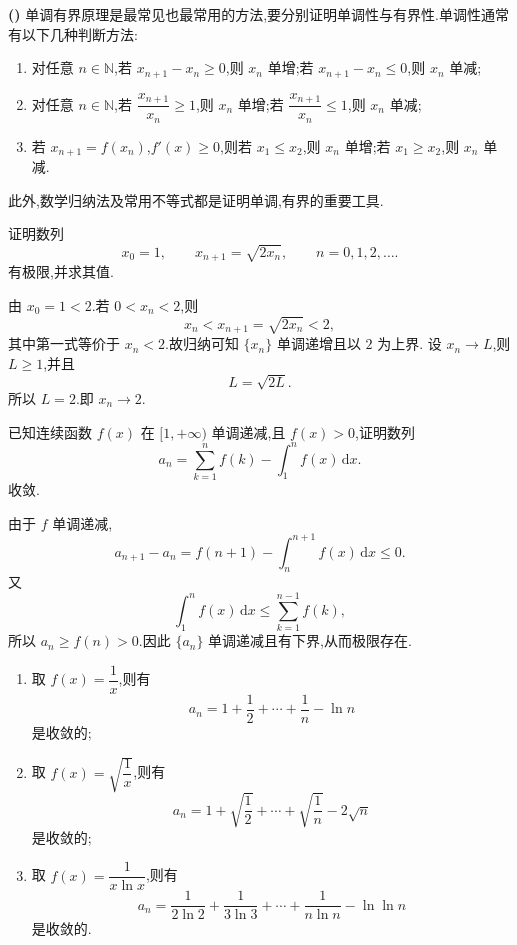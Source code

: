 \noindent\textbf{(\markstar)} 单调有界原理是最常见也最常用的方法,要分别证明单调性与有界性.单调性通常有以下几种判断方法:

\begin{enumerate}
  \item 对任意 $n\in\mathbb{N}$,若 $x_{n+1}-x_n\geq0$,则 $x_n$ 单增;若 $x_{n+1}-x_n\leq0$,则 $x_n$ 单减;
  \item 对任意 $n\in\mathbb{N}$,若 $\dfrac{x_{n+1}}{x_n}\geq1$,则 $x_n$ 单增;若 $\dfrac{x_{n+1}}{x_n}\leq1$,则 $x_n$ 单减;
  \item 若 $x_{n+1}=f(x_n)$,$f'(x)\geq0$,则若 $x_1\leq x_2$,则 $x_n$ 单增;若 $x_1\geq x_2$,则 $x_n$ 单减.
\end{enumerate}

此外,数学归纳法及常用不等式都是证明单调,有界的重要工具.

\begin{example}
  证明数列
  \[
    x_0=1,\qquad x_{n+1}=\sqrt{2x_n},\qquad n=0,1,2,\ldots.
  \]
  有极限,并求其值.
\end{example}
\exampleblank

\begin{solution}
  由 $x_0=1<2$.若 $0<x_n<2$,则
  \[
    x_n<x_{n+1}=\sqrt{2x_n}<2,
  \]
  其中第一式等价于 $x_n<2$.故归纳可知 $\{x_n\}$ 单调递增且以 $2$ 为上界.
  设 $x_n\to L$,则 $L\geq1$,并且
  \[
    L=\sqrt{2L}.
  \]
  所以 $L=2$.即 $x_n\to2$.
\end{solution}

\begin{example}[(\markstar)]
  已知连续函数 $f(x)$ 在 $\lbrack 1,+\infty)$ 单调递减,且 $f(x)>0$,证明数列
  \[
    a_n=\sum\limits_{k=1}^n f(k)-\int_1^n f(x)\,\mathrm{d}x.
  \]
  收敛.
\end{example}
\exampleblank

\begin{solution}
  由于 $f$ 单调递减,
  \[
    a_{n+1}-a_n
    =f(n+1)-\int_n^{n+1}f(x)\,\mathrm{d}x\leq0.
  \]
  又
  \[
    \displaystyle\int_1^n f(x)\,\mathrm{d}x
    \leq\sum\limits_{k=1}^{n-1}f(k),
  \]
  所以 $a_n\geq f(n)>0$.因此 $\{a_n\}$ 单调递减且有下界,从而极限存在.
\end{solution}

\begin{remark}
  \leavevmode
  \begin{enumerate}
    \item 取 $f(x)=\dfrac{1}{x}$,则有
          \[
            a_n=1+\dfrac{1}{2}+\cdots+\dfrac{1}{n}-\ln n
          \]
          是收敛的;
    \item 取 $f(x)=\sqrt{\dfrac{1}{x}}$,则有
          \[
            a_n=1+\sqrt{\dfrac{1}{2}}+\cdots+\sqrt{\dfrac{1}{n}}-2\sqrt n
          \]
          是收敛的;
    \item 取 $f(x)=\dfrac{1}{x\ln x}$,则有
          \[
            a_n=\dfrac{1}{2\ln2}+\dfrac{1}{3\ln3}+\cdots+\dfrac{1}{n\ln n}-\ln\ln n
          \]
          是收敛的.
  \end{enumerate}
\end{remark}

